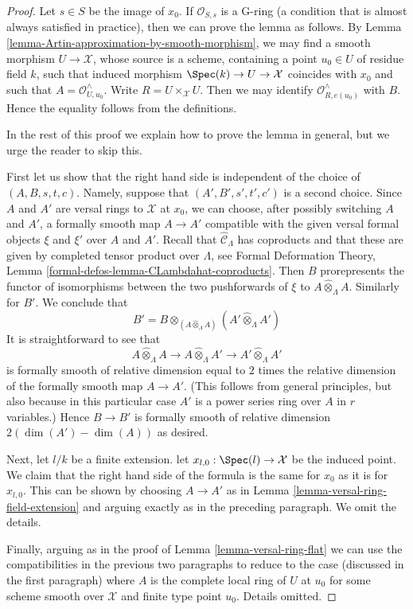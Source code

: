 \begin{proof}
Let $s \in S$ be the image of $x_0$. If $\mathcal{O}_{S, s}$
is a G-ring (a condition that is almost always satisfied in practice),
then we can prove the lemma as follows.
By Lemma \ref{lemma-Artin-approximation-by-smooth-morphism},
we may find a smooth morphism $U \to \mathcal{X}$, whose source is a scheme,
containing a point $u_0 \in U$ of residue field $k$, such that induced
morphism $\Spec(k) \to U \to \mathcal{X}$ coincides with $x_0$
and such that $A = \mathcal{O}_{U, u_0}^\wedge$.
Write $R = U \times_\mathcal{X} U$. Then we may identify
$\mathcal{O}_{R, e(u_0)}^\wedge$ with $B$.
Hence the equality follows from the definitions.

\medskip\noindent
In the rest of this proof we explain how to prove the lemma in
general, but we urge the reader to skip this.

\medskip\noindent
First let us show that the right hand side is independent of the choice
of $(A, B, s, t, c)$. Namely, suppose that $(A', B', s', t', c')$
is a second choice. Since $A$ and $A'$ are versal rings to $\mathcal{X}$
at $x_0$, we can choose, after possibly switching $A$ and $A'$,
a formally smooth map $A \to A'$ compatible with the given versal
formal objects $\xi$ and $\xi'$ over $A$ and $A'$.
Recall that $\widehat{\mathcal{C}}_\Lambda$ has
coproducts and that these are given by completed tensor product
over $\Lambda$, see Formal Deformation Theory, Lemma
\ref{formal-defos-lemma-CLambdahat-coproducts}.
Then $B$ prorepresents the functor of isomorphisms between the
two pushforwards of $\xi$ to $A \widehat{\otimes}_\Lambda A$.
Similarly for $B'$. We conclude that
$$
B' =
B \otimes_{(A \widehat{\otimes}_\Lambda A)}
(A' \widehat{\otimes}_\Lambda A')
$$
It is straightforward to see that
$$
A \widehat{\otimes}_\Lambda A \longrightarrow
A \widehat{\otimes}_\Lambda A' \longrightarrow
A' \widehat{\otimes}_\Lambda A'
$$
is formally smooth of relative dimension equal to $2$ times the
relative dimension of the formally smooth map $A \to A'$.
(This follows from general principles, but also because
in this particular case $A'$ is a power series ring over $A$
in $r$ variables.) Hence $B \to B'$ is formally smooth of
relative dimension $2(\dim(A') - \dim(A))$ as desired.

\medskip\noindent
Next, let $l/k$ be a finite extension. let
$x_{l, 0} : \Spec(l) \to \mathcal{X}$ be
the induced point. We claim that the right hand side of the formula
is the same for $x_0$ as it is for $x_{l, 0}$.
This can be shown by choosing $A \to A'$ as in
Lemma \ref{lemma-versal-ring-field-extension}
and arguing exactly as in the preceding paragraph.
We omit the details.

\medskip\noindent
Finally, arguing as in the proof of Lemma \ref{lemma-versal-ring-flat}
we can use the compatibilities in the previous two paragraphs
to reduce to the case (discussed in the first paragraph)
where $A$ is the complete local ring of $U$ at $u_0$ for some
scheme smooth over $\mathcal{X}$ and finite type point $u_0$.
Details omitted.
\end{proof}













